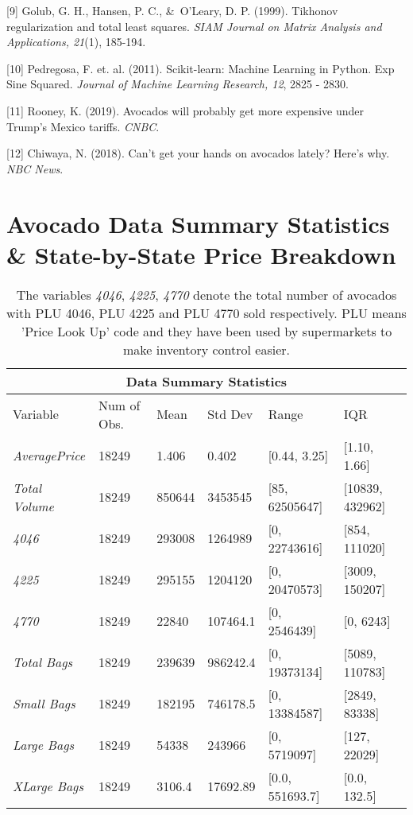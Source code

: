 \documentclass{article}
\begin{document}
[9] Golub, G. H., Hansen, P. C., \&\ O'Leary, D. P. (1999). Tikhonov regularization and total least squares. \textit{SIAM Journal on Matrix Analysis and Applications, 21}(1), 185-194.

[10] Pedregosa, F. et. al. (2011). Scikit-learn: Machine Learning in Python. Exp Sine Squared. \textit{Journal of Machine Learning Research, 12}, 2825 - 2830. 

[11] Rooney, K. (2019). Avocados will probably get more expensive under Trump’s Mexico tariffs. \textit{CNBC}.

[12] Chiwaya, N. (2018). Can’t get your hands on avocados lately? Here’s why. \textit{NBC News}. 


\newpage
\appendix
\section{Avocado Data Summary Statistics \& State-by-State Price Breakdown}

\begin{table}[h!]
\centering
\begin{tabular}{ |p{2.0 cm}||p{2.0 cm}|p{2.2 cm}|p{2.2 cm}|p{2.2 cm}|p{2.4 cm}|}
 \hline
 \multicolumn{6}{|c|}{Data Summary Statistics} \\
 \hline
 Variable & Num of Obs. & Mean & Std Dev & Range & IQR \\
 \hline
 \textit{AveragePrice} &  18249  &  1.406 & 0.402 & [0.44, 3.25] & [1.10, 1.66]   \\
 \textit{Total Volume} &  18249  & 850644 & 3453545 & [85, 62505647] & [10839, 432962]  \\
 \textit{4046} & 18249 & 293008 & 1264989 & [0, 22743616] & [854, 111020] \\
 \textit{4225} & 18249 & 295155 & 1204120 & [0, 20470573] & [3009, 150207] \\
 \textit{4770} & 18249 & 22840 & 107464.1 & [0, 2546439] & [0, 6243] \\
 \textit{Total Bags} & 18249 & 239639 & 986242.4 & [0, 19373134] & [5089, 110783]\\
 \textit{Small Bags} & 18249 & 182195 & 746178.5 & [0, 13384587] & [2849, 83338] \\
 \textit{Large Bags} & 18249 & 54338 & 243966 & [0, 5719097] & [127, 22029]\\
 \textit{XLarge Bags} & 18249 & 3106.4 & 17692.89 & [0.0, 551693.7] & [0.0, 132.5] \\ 
 \hline
\end{tabular}
\caption{The variables \textit{4046}, \textit{4225}, \textit{4770} denote the total number of avocados with PLU 4046, PLU 4225 and PLU 4770 sold respectively. PLU means 'Price Look Up' code and they have been used by supermarkets to make inventory control easier. }
\end{table}
\end{document}
